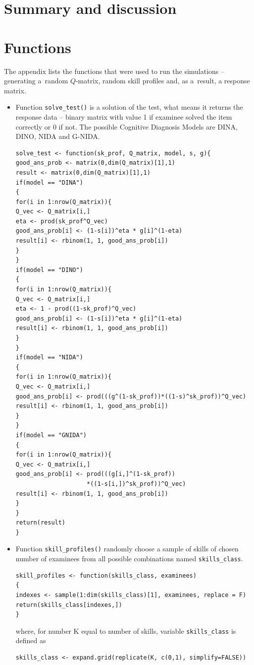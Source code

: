 \documentclass[english]{pwr_wmat_praca_dyplomowa}
\theoremstyle{plain}
\theoremstyle{definition}
\numberwithin{theorem}{chapter}
\begin{document}
{\backmatter \chapter{Summary and discussion}}

\appendix
{\chapter{Functions}}\label{appendix}

\noindent The appendix lists the functions that were used to run the simulations -- generating a~random $Q$-matrix, random skill profiles and, as a~result, a response matrix. \vspace{5pt}


\begin{itemize}

\item  Function \texttt{solve\_test()} is a solution of the test, what means it returns the response data -- binary matrix with value 1 if examinee solved the item correctly or 0 if not. The possible Cognitive Diagnosis Models are DINA, DINO, NIDA and G-NIDA.
\begin{verbatim}
solve_test <- function(sk_prof, Q_matrix, model, s, g){
good_ans_prob <- matrix(0,dim(Q_matrix)[1],1)
result <- matrix(0,dim(Q_matrix)[1],1)
if(model == "DINA")
{
for(i in 1:nrow(Q_matrix)){
Q_vec <- Q_matrix[i,]
eta <- prod(sk_prof^Q_vec)
good_ans_prob[i] <- (1-s[i])^eta * g[i]^(1-eta)
result[i] <- rbinom(1, 1, good_ans_prob[i])
}
}
if(model == "DINO")
{
for(i in 1:nrow(Q_matrix)){
Q_vec <- Q_matrix[i,]
eta <- 1 - prod((1-sk_prof)^Q_vec)
good_ans_prob[i] <- (1-s[i])^eta * g[i]^(1-eta)
result[i] <- rbinom(1, 1, good_ans_prob[i])
}
}
if(model == "NIDA")
{
for(i in 1:nrow(Q_matrix)){
Q_vec <- Q_matrix[i,]
good_ans_prob[i] <- prod(((g^(1-sk_prof))*((1-s)^sk_prof))^Q_vec)
result[i] <- rbinom(1, 1, good_ans_prob[i])
}
}
if(model == "GNIDA")
{
for(i in 1:nrow(Q_matrix)){
Q_vec <- Q_matrix[i,]
good_ans_prob[i] <- prod(((g[i,]^(1-sk_prof))
                    *((1-s[i,])^sk_prof))^Q_vec)
result[i] <- rbinom(1, 1, good_ans_prob[i])
}
}
return(result)
}
\end{verbatim}

\item Function \texttt{skill\_profiles()} randomly choose a sample of skills of chosen number of examinees from all possible combinations named \texttt{skills\_class}.

\begin{verbatim}
skill_profiles <- function(skills_class, examinees)
{
indexes <- sample(1:dim(skills_class)[1], examinees, replace = F)
return(skills_class[indexes,])
}
\end{verbatim}
\noindent where, for number K equal to number of skills, variable \texttt{skills\_class} is defined as
\begin{verbatim}
skills_class <- expand.grid(replicate(K, c(0,1), simplify=FALSE))
\end{verbatim}


\end{itemize}
\end{document}
